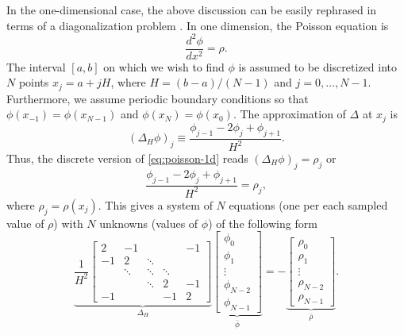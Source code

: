 In the one-dimensional case, the above discussion can be easily rephrased in terms of a diagonalization problem \cite{demanet2013fourier}.
In one dimension, the Poisson equation is
\begin{equation}\label{eq:poisson-1d}
    \frac{d^2 \phi}{dx^2} = \rho.
\end{equation}
The interval $[a, b]$ on which we wish to find $\phi$ is assumed to be discretized into $N$ points $x_j = a + jH$, where $H = (b - a) / (N - 1)$ and $j=0,\dots, N-1$.
Furthermore, we assume periodic boundary conditions so that $\phi(x_{-1}) = \phi(x_{N-1})$ and $\phi(x_{N}) = \phi(x_0)$.
The approximation of $\Delta$ at $x_j$ is
\begin{equation*}
    (\Delta_H \phi)_j \equiv \frac{\phi_{j-1} - 2\phi_j + \phi_{j+1}}{H^2}.
\end{equation*}
Thus, the discrete version of \autoref{eq:poisson-1d} reads $(\Delta_H \phi)_j = \rho_j$ or
\begin{equation*}
    \frac{\phi_{j-1}-2\phi_j + \phi_{j+1}}{H^2} = \rho_j,
\end{equation*}
where $\rho_j = \rho(x_j)$.
This gives a system of $N$ equations (one per each sampled value of $\rho$) with $N$ unknowns (values of $\phi$) of the following form
\begin{equation}\label{eq:poisson-1d-matrix}
    \underbrace{\frac{1}{H^2}
        \begin{bmatrix}
            2  & -1     &        &        & -1 \\
            -1 & 2      & \ddots &        &    \\
               & \ddots & \ddots & \ddots &    \\
               &        & \ddots & 2      & -1 \\
            -1 &        &        & -1     & 2
        \end{bmatrix}}_{\Delta_H}
    \underbrace{\begin{bmatrix}
            \phi_0     \\
            \phi_1     \\
            \vdots     \\
            \phi_{N-2} \\
            \phi_{N-1}
        \end{bmatrix}}_{\bar{\phi}}
    = -\underbrace{\begin{bmatrix}
            \rho_0     \\
            \rho_1     \\
            \vdots     \\
            \rho_{N-2} \\
            \rho_{N-1}
        \end{bmatrix}}_{\bar{\rho}}.
\end{equation}
